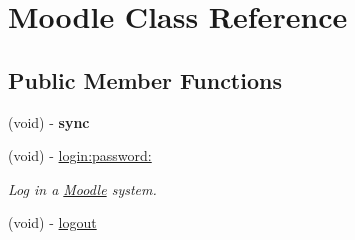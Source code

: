 \hypertarget{interface_moodle}{
\section{Moodle Class Reference}
\label{interface_moodle}
}
\subsection*{Public Member Functions}
\begin{DoxyCompactItemize}
\item 
\hypertarget{interface_moodle_ae39455d7d9d76a4d10ffe971409779f2}{
(void) -\/ {\bfseries sync}}
\label{interface_moodle_ae39455d7d9d76a4d10ffe971409779f2}

\item 
(void) -\/ \hyperlink{interface_moodle_a9213ffaec574e053426c7889c096ab3d}{login:password:}
\begin{DoxyCompactList}\small\item\em Log in a \hyperlink{interface_moodle}{Moodle} system. \item\end{DoxyCompactList}\item 
\hypertarget{interface_moodle_a15ea5da83295031cf3384ce7b13ca570}{
(void) -\/ \hyperlink{interface_moodle_a15ea5da83295031cf3384ce7b13ca570}{logout}}
\label{interface_moodle_a15ea5da83295031cf3384ce7b13ca570}


\end{DoxyCompactItemize}
